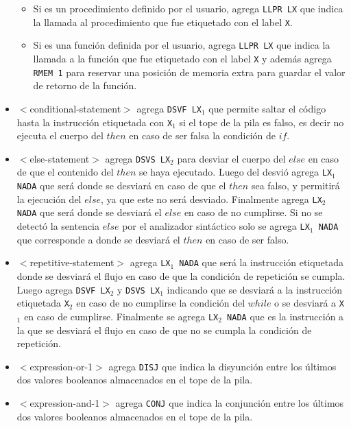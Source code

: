 \begin{itemize}
\begin{itemize}
	\item Si es un procedimiento definido por el usuario, agrega \texttt{LLPR LX} que indica la llamada al procedimiento que fue etiquetado con el label \texttt{X}.
	\item Si es una función definida por el usuario, agrega \texttt{LLPR LX} que indica la llamada a la función que fue etiquetado con el label \texttt{X} y además agrega \texttt{RMEM 1} para reservar una posición de memoria extra para guardar el valor de retorno de la función.
\end{itemize}
\item $<$conditional-statement$>$ agrega \texttt{DSVF LX$_{1}$} que permite saltar el código hasta la instrucción etiquetada con \texttt{X$_{1}$} si el tope de la pila es falso, es decir no ejecuta el cuerpo del $then$ en caso de ser falsa la condición de $if$.
\item $<$else-statement$>$ agrega \texttt{DSVS LX$_{2}$} para desviar el cuerpo del $else$ en caso de que el contenido del $then$ se haya ejecutado. Luego del desvió agrega \texttt{LX$_{1}$ NADA} que será donde se desviará en caso de que el $then$ sea falso, y permitirá la ejecución del $else$, ya que este no será desviado. Finalmente agrega \texttt{LX$_{2}$ NADA} que será donde se desviará el $else$ en caso de no cumplirse. Si no se detectó la sentencia $else$ por el analizador sintáctico solo se agrega \texttt{LX$_{1}$ NADA} que corresponde a donde se desviará el $then$ en caso de ser falso.
\item $<$repetitive-statement$>$ agrega \texttt{LX$_{1}$ NADA} que será la instrucción etiquetada donde se desviará el flujo en caso de que la condición de repetición se cumpla. Luego agrega \texttt{DSVF LX$_{2}$} y \texttt{DSVS LX$_{1}$} indicando que se desviará a la instrucción etiquetada \texttt{X$_{2}$} en caso de no cumplirse la condición del $while$ o se desviará a \texttt{X$_{1}$} en caso de cumplirse. Finalmente se agrega \texttt{LX$_{2}$ NADA} que es la instrucción a la que se desviará el flujo en caso de que no se cumpla la condición de repetición.
\item $<$expression-or-1$>$ agrega \texttt{DISJ} que indica la disyunción entre los últimos dos valores booleanos almacenados en el tope de la pila.
\item $<$expression-and-1$>$ agrega \texttt{CONJ} que indica la conjunción entre los últimos dos valores booleanos almacenados en el tope de la pila.

\end{itemize}

